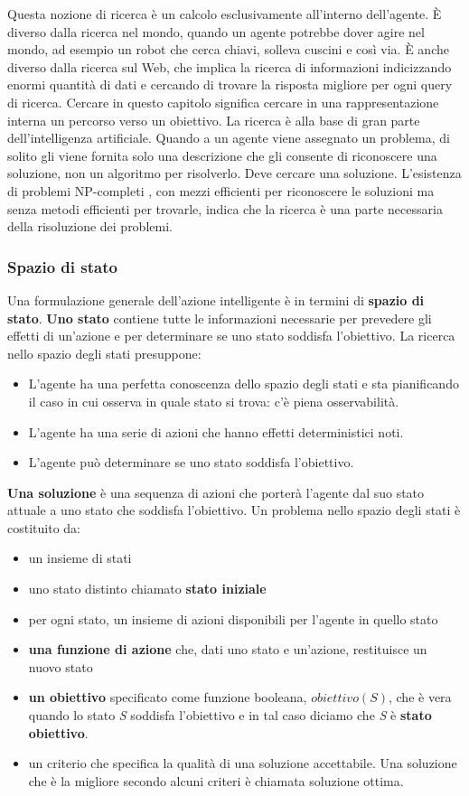 \documentclass[a4paper]{extarticle}
\begin{document}
Questa nozione di ricerca è un calcolo esclusivamente all'interno dell'agente. È diverso dalla ricerca nel mondo, quando un agente potrebbe dover agire nel mondo, ad esempio un robot che cerca chiavi, solleva cuscini e così via. È anche diverso dalla ricerca sul Web, che implica la ricerca di informazioni indicizzando enormi quantità di dati e cercando di trovare la risposta migliore per ogni query di ricerca. Cercare in questo capitolo significa cercare in una rappresentazione interna un percorso verso un obiettivo. La ricerca è alla base di gran parte dell'intelligenza artificiale. Quando a un agente viene assegnato un problema, di solito gli viene fornita solo una descrizione che gli consente di riconoscere una soluzione, non un algoritmo per risolverlo. Deve cercare una soluzione. L'esistenza di problemi NP-completi , con mezzi efficienti per riconoscere le soluzioni ma senza metodi efficienti per trovarle, indica che la ricerca è una parte necessaria della risoluzione dei problemi.

\subsubsection{Spazio di stato}

Una formulazione generale dell'azione intelligente è in termini di \textbf{spazio di stato}. \textbf{Uno stato} contiene tutte le informazioni necessarie per prevedere gli effetti di un'azione e per determinare se uno stato soddisfa l'obiettivo. La ricerca nello spazio degli stati presuppone:

\begin{itemize}
\item L'agente ha una perfetta conoscenza dello spazio degli stati e sta pianificando il caso in cui osserva in quale stato si trova: c'è piena osservabilità.
\item L'agente ha una serie di azioni che hanno effetti deterministici noti.
\item L'agente può determinare se uno stato soddisfa l'obiettivo.
\end{itemize}
\textbf{Una soluzione} è una sequenza di azioni che porterà l'agente dal suo stato attuale a uno stato che soddisfa l'obiettivo. Un problema nello spazio degli stati è costituito da:
\begin{itemize}
\item un insieme di stati
\item uno stato distinto chiamato \textbf{stato iniziale}
\item per ogni stato, un insieme di azioni disponibili per l'agente in quello stato
\item \textbf{una funzione di azione} che, dati uno stato e un'azione, restituisce un nuovo stato
\item \textbf{un obiettivo} specificato come funzione booleana, $obiettivo(S)$, che è vera quando lo stato \textit{S} soddisfa l'obiettivo e in tal caso diciamo che \textit{S} è \textbf{stato obiettivo}.
\item un criterio che specifica la qualità di una soluzione accettabile. Una soluzione che è la migliore secondo alcuni criteri è chiamata soluzione ottima.
\end{itemize}
\end{document}
